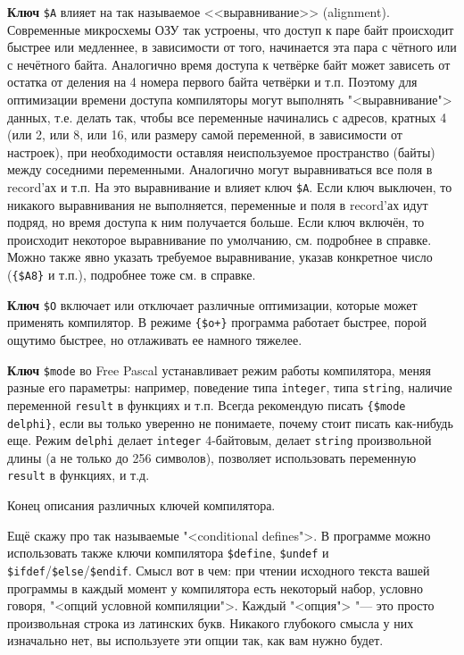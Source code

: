 \textbf{Ключ} \verb|$A| влияет на так называемое <<выравнивание>> (alignment). Современные 
микросхемы ОЗУ так устроены, что доступ к паре байт 
происходит быстрее или медленнее, в зависимости от того, начинается эта пара с чётного или с 
нечётного байта. Аналогично время доступа к четвёрке байт может зависеть от остатка от деления на 4 
номера первого байта четвёрки и т.п. Поэтому для оптимизации времени доступа компиляторы могут 
выполнять "<выравнивание"> данных, т.е. делать так, чтобы все переменные начинались с адресов, 
кратных 4 (или 2, или 8, или 16, или размеру самой переменной, в зависимости от настроек), при необходимости 
оставляя неиспользуемое пространство (байты) между соседними переменными.
Аналогично могут выравниваться все поля в record'ах и т.п. На это выравнивание и влияет ключ 
\verb|$A|. Если ключ выключен, то никакого выравнивания не выполняется, переменные и поля в 
record'ах идут подряд, но время доступа к ним получается больше. Если ключ включён, то происходит 
некоторое выравнивание по умолчанию, см. подробнее в справке. Можно также явно указать требуемое 
выравнивание, указав конкретное число (\verb|{$A8}| и т.п.), подробнее тоже см. в справке.

\textbf{Ключ} \verb|$O| включает или отключает различные оптимизации, которые может применять компилятор. В режиме \verb|{$o+}| программа работает быстрее, порой ощутимо быстрее, но отлаживать ее намного тяжелее.

\textbf{Ключ} \verb|$mode| во Free Pascal устанавливает режим работы компилятора, меняя разные его параметры:
например, поведение типа \verb|integer|, типа \verb|string|, наличие переменной \verb|result| в функциях и т.п. Всегда рекомендую писать \verb|{$mode delphi}|, если вы только уверенно не понимаете, почему стоит писать как-нибудь еще. Режим \verb|delphi| делает \verb|integer| 4-байтовым, делает \verb|string| произвольной длины (а не только до 256 символов), позволяет использовать переменную \verb|result| в функциях, и т.д.

Конец описания различных ключей компилятора.

Ещё скажу про так называемые "<conditional defines">. В программе можно использовать также ключи 
компилятора \verb|$define|, \verb|$undef| и \verb|$ifdef|/\verb|$else|/\verb|$endif|. Смысл вот в 
чем: при чтении исходного текста вашей программы в каждый момент у компилятора есть некоторый 
набор, условно говоря, "<опций условной компиляции">. Каждый "<опция"> "--- это просто произвольная 
строка из латинских букв. Никакого глубокого смысла у них изначально нет, вы используете эти опции 
так, как вам нужно будет.


